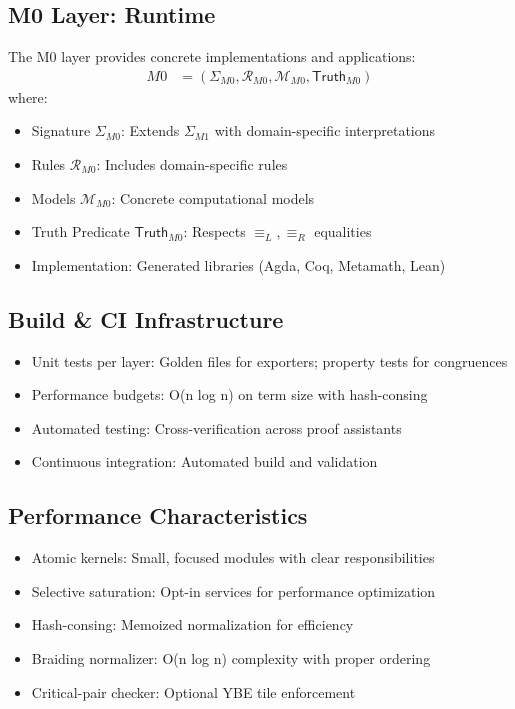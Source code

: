 \subsection{M0 Layer: Runtime}

\begin{definition}
\label{def:m0-complete}
The M0 layer provides concrete implementations and applications:
\begin{align}
M0 &= (\Sigma_{M0}, \mathcal{R}_{M0}, \mathcal{M}_{M0}, \mathsf{Truth}_{M0})
\end{align}
where:
\begin{itemize}
\item Signature $\Sigma_{M0}$: Extends $\Sigma_{M1}$ with domain-specific interpretations
\item Rules $\mathcal{R}_{M0}$: Includes domain-specific rules
\item Models $\mathcal{M}_{M0}$: Concrete computational models
\item Truth Predicate $\mathsf{Truth}_{M0}$: Respects $\equiv_L, \equiv_R$ equalities
\item Implementation: Generated libraries (Agda, Coq, Metamath, Lean)
\end{itemize}
\end{definition}

\subsection{Build \& CI Infrastructure}

\begin{itemize}
\item Unit tests per layer: Golden files for exporters; property tests for congruences
\item Performance budgets: O(n log n) on term size with hash-consing
\item Automated testing: Cross-verification across proof assistants
\item Continuous integration: Automated build and validation
\end{itemize}

\subsection{Performance Characteristics}

\begin{itemize}
\item Atomic kernels: Small, focused modules with clear responsibilities
\item Selective saturation: Opt-in services for performance optimization
\item Hash-consing: Memoized normalization for efficiency
\item Braiding normalizer: O(n log n) complexity with proper ordering
\item Critical-pair checker: Optional YBE tile enforcement
\end{itemize}

